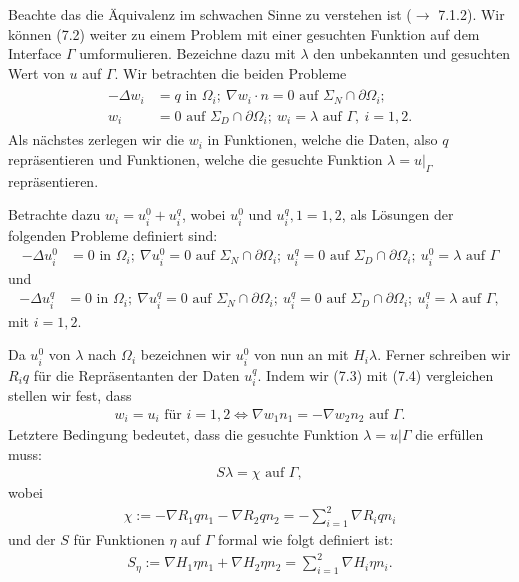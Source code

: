 Beachte das die Äquivalenz im schwachen Sinne zu verstehen ist ($\to$ 7.1.2).
Wir können (7.2) weiter zu einem Problem mit einer gesuchten Funktion auf dem Interface $\Gamma$ umformulieren.
Bezeichne dazu mit $\lambda$ den unbekannten und gesuchten Wert von $u$ auf $\Gamma$.
Wir betrachten die beiden Probleme
\begin{align}
\begin{split}
-\Delta w_i &= q \text{ in }\Omega_i; ~\nabla w_i\cdot n =0 \text{ auf } \Sigma_N\cap \partial\Omega_i;\\
w_i &= 0 \text{ auf } \Sigma_D\cap \partial\Omega_i;~ w_i=\lambda \text{ auf } \Gamma,~i=1,2.
\end{split}
\end{align}
Als nächstes zerlegen wir die $w_i$ in Funktionen, welche die Daten, also $q$ repräsentieren und Funktionen, welche die gesuchte Funktion $\lambda=u|_{\Gamma}$ repräsentieren.

Betrachte dazu $w_i=u_i^0 + u_i^q$, wobei  $u_i^0$ und $u_i^q,1=1,2$, als Lösungen der folgenden Probleme definiert sind:
\begin{align}
-\Delta u_i^0 &= 0\text{ in } \Omega_i;~\nabla u_i^0 = 0 \text{ auf }\Sigma_N\cap \partial\Omega_i;~ u_i^q=0 \text{ auf } \Sigma_D\cap \partial\Omega_i;~ u_i^0=\lambda \text{ auf } \Gamma
\end{align}
und 
\begin{align}
-\Delta u_i^q &= 0\text{ in } \Omega_i;~\nabla u_i^q = 0 \text{ auf }\Sigma_N\cap \partial\Omega_i;~ u_i^q=0 \text{ auf } \Sigma_D\cap \partial\Omega_i;~ u_i^q=\lambda \text{ auf } \Gamma,
\end{align}
mit $i=1,2$.

Da $u_i^0$  von $\lambda$ nach $\Omega_i$ bezeichnen wir $u_i^0$ von nun an mit $H_i\lambda$.
Ferner schreiben wir $R_iq$ für die Repräsentanten der Daten $u_i^q$.
Indem wir (7.3) mit (7.4) vergleichen stellen wir fest, dass
\begin{align}
w_i=u_i \text{ für } i=1,2 \Leftrightarrow \nabla w_1n_1 = -\nabla w_2n_2 \text{ auf } \Gamma.
\end{align}
Letztere Bedingung bedeutet, dass die gesuchte Funktion $\lambda=u|\Gamma$ die  erfüllen muss:
\begin{align}
S\lambda = \chi \text{ auf } \Gamma,
\end{align}
wobei
\begin{align}
\chi := -\nabla R_1qn_1 - \nabla R_2qn_2 = - \sum_{i=1}^2 \nabla R_iqn_i
\end{align}
und der  $S$ für Funktionen $\eta$ auf $\Gamma$ formal wie folgt definiert ist:
\begin{align}
S_{\eta} := \nabla H_1\eta n_1 + \nabla H_2\eta n_2 = \sum_{i=1}^2 \nabla H_i\eta n_i.
\end{align}

